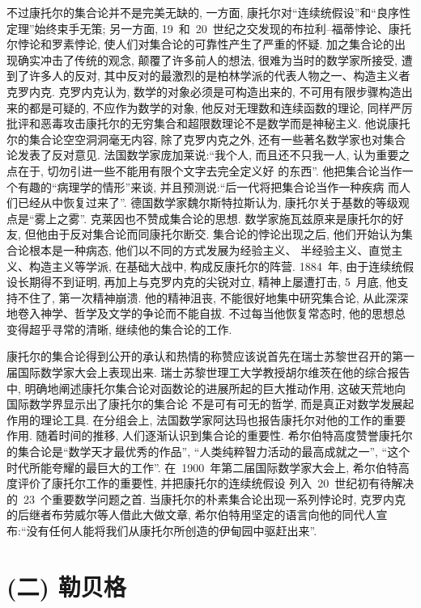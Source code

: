 不过康托尔的集合论并不是完美无缺的, 一方面, 康托尔对``连续统假设''和``良序性定理''始终束手无策; 另一方面, 19~和~20~世纪之交发现的布拉利--福蒂悖论、康托尔悖论和罗素悖论, 使人们对集合论的可靠性产生了严重的怀疑. 加之集合论的出现确实冲击了传统的观念, 颠覆了许多前人的想法, 很难为当时的数学家所接受, 遭到了许多人的反对, 其中反对的最激烈的是柏林学派的代表人物之一、构造主义者克罗内克. 克罗内克认为, 数学的对象必须是可构造出来的, 不可用有限步骤构造出来的都是可疑的, 不应作为数学的对象, 他反对无理数和连续函数的理论, 同样严厉批评和恶毒攻击康托尔的无穷集合和超限数理论不是数学而是神秘主义. 他说康托尔的集合论空空洞洞毫无内容,  除了克罗内克之外, 还有一些著名数学家也对集合论发表了反对意见. 法国数学家庞加莱说:``我个人, 而且还不只我一人, 认为重要之点在于, 切勿引进一些不能用有限个文字去完全定义好
的东西''. 他把集合论当作一个有趣的``病理学的情形''来谈, 并且预测说:``后一代将把集合论当作一种疾病
而人们已经从中恢复过来了''. 德国数学家魏尔斯特拉斯认为, 康托尔关于基数的等级观点是``雾上之雾''. 克莱因也不赞成集合论的思想. 数学家施瓦兹原来是康托尔的好友, 但他由于反对集合论而同康托尔断交. 集合论的悖论出现之后, 他们开始认为集合论根本是一种病态, 他们以不同的方式发展为经验主义、
半经验主义、直觉主义、构造主义等学派, 在基础大战中, 构成反康托尔的阵营.
1884~年, 由于连续统假设长期得不到证明, 再加上与克罗内克的尖锐对立, 精神上屡遭打击, 5~月底, 他支持不住了, 第一次精神崩溃. 他的精神沮丧, 不能很好地集中研究集合论, 从此深深地卷入神学、哲学及文学的争论而不能自拔. 不过每当他恢复常态时, 他的思想总变得超乎寻常的清晰, 继续他的集合论的工作.

康托尔的集合论得到公开的承认和热情的称赞应该说首先在瑞士苏黎世召开的第一届国际数学家大会上表现出来. 瑞士苏黎世理工大学教授胡尔维茨在他的综合报告中, 明确地阐述康托尔集合论对函数论的进展所起的巨大推动作用, 这破天荒地向国际数学界显示出了康托尔的集合论
不是可有可无的哲学, 而是真正对数学发展起作用的理论工具. 在分组会上, 法国数学家阿达玛也报告康托尔对他的工作的重要作用. 随着时间的推移, 人们逐渐认识到集合论的重要性. 希尔伯特高度赞誉康托尔的集合论是``数学天才最优秀的作品'', ``人类纯粹智力活动的最高成就之一'', ``这个时代所能夸耀的最巨大的工作''. 在~1900~年第二届国际数学家大会上, 希尔伯特高度评价了康托尔工作的重要性, 并把康托尔的连续统假设
列入~20~世纪初有待解决的~23~个重要数学问题之首. 当康托尔的朴素集合论出现一系列悖论时, 克罗内克的后继者布劳威尔等人借此大做文章, 希尔伯特用坚定的语言向他的同代人宣布:``没有任何人能将我们从康托尔所创造的伊甸园中驱赶出来''.
\bigskip

\section*{(二) 勒贝格}


